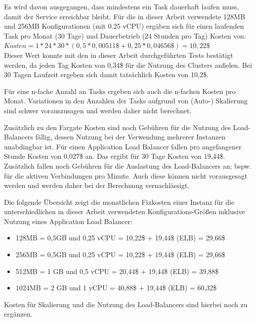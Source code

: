 Es wird davon ausgegangen, dass mindestens ein Task dauerhaft laufen muss, damit der Service erreichbar bleibt. Für die in dieser Arbeit verwendete 128MB und 256MB Konfigurationen (mit 0.25 vCPU) ergäben sich für einen laufenden Task pro Monat (30 Tage) und Dauerbetrieb (24 Stunden pro Tag) Kosten von: \\

$Kosten = 1 * 24 * 30 * (0,5 * 0,00511\$ + 0,25 * 0,04656\$) = 10,22\$$ \\

Dieser Wert konnte mit den in dieser Arbeit durchgeführten Tests bestätigt werden, da jeden Tag Kosten von 0,34\$ für die Nutzung des Clusters anfielen. Bei 30 Tagen Laufzeit ergeben sich damit tatsächlich Kosten von 10,2\$.

Für eine n-fache Anzahl an Tasks ergeben sich auch die n-fachen Kosten pro Monat. Variationen in den Anzahlen der Tasks aufgrund von (Auto-) Skalierung sind schwer vorauszusagen und werden daher nicht berechnet.

Zusätzlich zu den Fargate Kosten sind noch Gebühren für die Nutzung des Load-Balancers fällig, dessen Nutzung bei der Verwendung mehrerer Instanzen unabdingbar ist. Für einen Application Load Balancer fallen pro angefangener Stunde Kosten von 0,027\$ an. Das ergibt für 30 Tage Kosten von 19,44\$. Zusätzlich fallen noch Gebühren für die Auslastung des Load-Balancers an; bspw. für die aktiven Verbindungen pro Minute\cite{noauthor_preise_nodate}. Auch diese können nicht vorausgesagt werden und werden daher bei der Berechnung vernachlässigt.

Die folgende Übersicht zeigt die monatlichen Fixkosten einer Instanz für die unterschiedlichen in dieser Arbeit verwendeten Konfigurations-Größen inklusive Nutzung eines Application Load Balancer:

\begin{itemize}
    \item 128MB = 0,5GB und 0,25 vCPU = 10,22\$ + 19,44\$ (ELB) = 29,66\$
    \item 256MB = 0,5GB und 0,25 vCPU = 10,22\$ + 19,44\$ (ELB) = 29,66\$
    \item 512MB = 1  GB und 0,5  vCPU = 20,44\$ + 19,44\$ (ELB) = 39,88\$
    \item 1024MB = 2 GB und 1    vCPU = 40,88\$ + 19,44\$ (ELB) = 60,32\$
\end{itemize}

\noindent
Kosten für Skalierung und die Nutzung des Load-Balancers sind hierbei noch zu ergänzen. 

